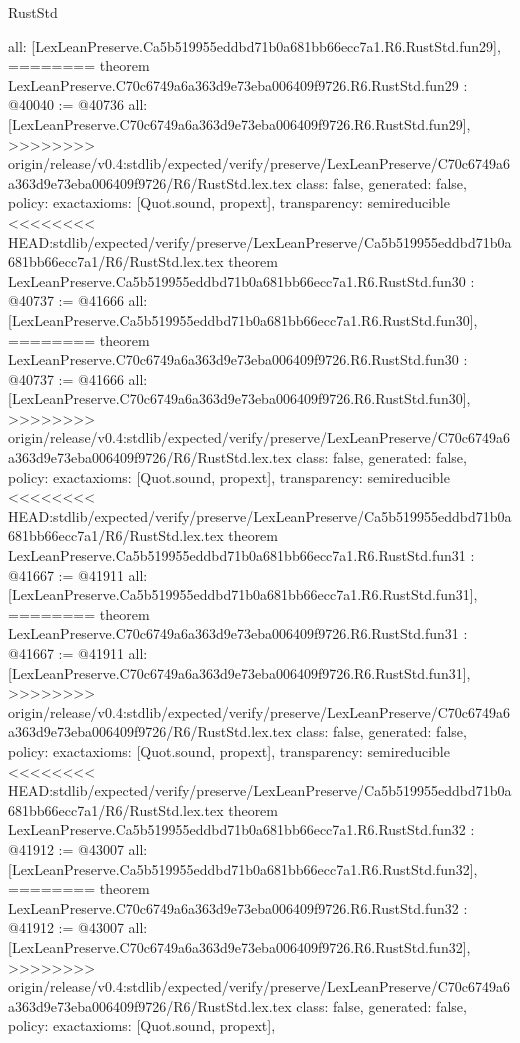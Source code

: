 \begin{lexlean}{RustStd}
\begin{coremodule}
{\begin{coremodule}
{{{{{{{{{{{{{{{{{{{{{{{{{{{{{{{{  all: [LexLeanPreserve.Ca5b519955eddbd71b0a681bb66ecc7a1.R6.RustStd.fun29],
========
theorem LexLeanPreserve.C70c6749a6a363d9e73eba006409f9726.R6.RustStd.fun29 : @40040 := @40736 {
  all: [LexLeanPreserve.C70c6749a6a363d9e73eba006409f9726.R6.RustStd.fun29],
>>>>>>>> origin/release/v0.4:stdlib/expected/verify/preserve/LexLeanPreserve/C70c6749a6a363d9e73eba006409f9726/R6/RustStd.lex.tex
  class: false,
  generated: false,
  policy: exact{axioms: [Quot.sound, propext]},
  transparency: semireducible
}
<<<<<<<< HEAD:stdlib/expected/verify/preserve/LexLeanPreserve/Ca5b519955eddbd71b0a681bb66ecc7a1/R6/RustStd.lex.tex
theorem LexLeanPreserve.Ca5b519955eddbd71b0a681bb66ecc7a1.R6.RustStd.fun30 : @40737 := @41666 {
  all: [LexLeanPreserve.Ca5b519955eddbd71b0a681bb66ecc7a1.R6.RustStd.fun30],
========
theorem LexLeanPreserve.C70c6749a6a363d9e73eba006409f9726.R6.RustStd.fun30 : @40737 := @41666 {
  all: [LexLeanPreserve.C70c6749a6a363d9e73eba006409f9726.R6.RustStd.fun30],
>>>>>>>> origin/release/v0.4:stdlib/expected/verify/preserve/LexLeanPreserve/C70c6749a6a363d9e73eba006409f9726/R6/RustStd.lex.tex
  class: false,
  generated: false,
  policy: exact{axioms: [Quot.sound, propext]},
  transparency: semireducible
}
<<<<<<<< HEAD:stdlib/expected/verify/preserve/LexLeanPreserve/Ca5b519955eddbd71b0a681bb66ecc7a1/R6/RustStd.lex.tex
theorem LexLeanPreserve.Ca5b519955eddbd71b0a681bb66ecc7a1.R6.RustStd.fun31 : @41667 := @41911 {
  all: [LexLeanPreserve.Ca5b519955eddbd71b0a681bb66ecc7a1.R6.RustStd.fun31],
========
theorem LexLeanPreserve.C70c6749a6a363d9e73eba006409f9726.R6.RustStd.fun31 : @41667 := @41911 {
  all: [LexLeanPreserve.C70c6749a6a363d9e73eba006409f9726.R6.RustStd.fun31],
>>>>>>>> origin/release/v0.4:stdlib/expected/verify/preserve/LexLeanPreserve/C70c6749a6a363d9e73eba006409f9726/R6/RustStd.lex.tex
  class: false,
  generated: false,
  policy: exact{axioms: [Quot.sound, propext]},
  transparency: semireducible
}
<<<<<<<< HEAD:stdlib/expected/verify/preserve/LexLeanPreserve/Ca5b519955eddbd71b0a681bb66ecc7a1/R6/RustStd.lex.tex
theorem LexLeanPreserve.Ca5b519955eddbd71b0a681bb66ecc7a1.R6.RustStd.fun32 : @41912 := @43007 {
  all: [LexLeanPreserve.Ca5b519955eddbd71b0a681bb66ecc7a1.R6.RustStd.fun32],
========
theorem LexLeanPreserve.C70c6749a6a363d9e73eba006409f9726.R6.RustStd.fun32 : @41912 := @43007 {
  all: [LexLeanPreserve.C70c6749a6a363d9e73eba006409f9726.R6.RustStd.fun32],
>>>>>>>> origin/release/v0.4:stdlib/expected/verify/preserve/LexLeanPreserve/C70c6749a6a363d9e73eba006409f9726/R6/RustStd.lex.tex
  class: false,
  generated: false,
  policy: exact{axioms: [Quot.sound, propext]},
}}}}}}}}}}}}}}}}}}}}}}}}}}}}}}}}}}}}
\end{coremodule}}
\end{coremodule}
\end{lexlean}
